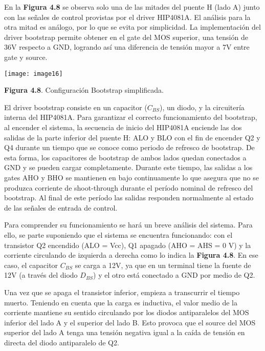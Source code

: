 \documentclass{article} %
\begin{document}
\noindent 

\noindent En la \textbf{Figura 4.8} se observa solo una de las mitades del puente H (lado A)  junto con las se\~{n}ales de control provistas por el driver HIP4081A. El an\'{a}lisis para la otra mitad es an\'{a}logo, por lo que se evita por simplicidad. La implementaci\'{o}n del driver bootstrap permite obtener en el gate del MOS superior, una tensi\'{o}n de 36V respecto a GND, logrando as\'{i} una diferencia de tensi\'{o}n mayor a 7V entre gate y source. 

\noindent 

\noindent \texttt{[image: image16]}

\noindent \textbf{Figura 4.8}. Configuraci\'{o}n Bootstrap simplificada.

\noindent 

\noindent El driver bootstrap consiste en un capacitor ($C_{BS}$), un diodo, y la circuiter\'{i}a interna del HIP4081A. Para garantizar el correcto funcionamiento del bootstrap, al encender el sistema, la secuencia de inicio del HIP4081A enciende las dos salidas de la parte inferior del puente H: ALO y BLO con el fin de encender Q2 y Q4 durante un tiempo que se conoce como periodo de refresco de bootstrap. De esta forma, los capacitores de bootstrap de ambos lados quedan conectados a GND y se pueden cargar completamente. Durante este tiempo, las salidas a los gates AHO y BHO se mantienen en bajo continuamente lo que asegura que no se produzca corriente de shoot-through durante el per\'{i}odo nominal de refresco del bootstrap. Al final de este per\'{i}odo las salidas responden normalmente al estado de las se\~{n}ales de entrada de control.

\noindent 

\noindent Para comprender su funcionamiento se har\'{a} un breve an\'{a}lisis del sistema. Para ello, se parte suponiendo que el sistema se encuentra funcionando: con el transistor Q2 encendido (ALO = Vcc), Q1 apagado (AHO = AHS = 0 V) y la corriente circulando de izquierda a derecha como lo indica la \textbf{Figura 4.8}. En ese caso, el capacitor $C_{BS}$ se carga a 12V, ya que en un terminal tiene la fuente de 12V (a trav\'{e}s del diodo $D_{BS}$) y el otro est\'{a} conectado a GND por medio de Q2.

\noindent 

\noindent Una vez que se apaga el transistor inferior, empieza a transcurrir el tiempo muerto. Teniendo en cuenta que la carga es inductiva, el valor medio de la corriente mantiene su sentido circulando por los diodos antiparalelos del MOS inferior del lado A y el superior del lado B. Esto provoca que el source del MOS superior del lado A tenga una tensi\'{o}n negativa igual a la ca\'{i}da de tensi\'{o}n en directa del diodo antiparalelo de Q2. 
\end{document}
